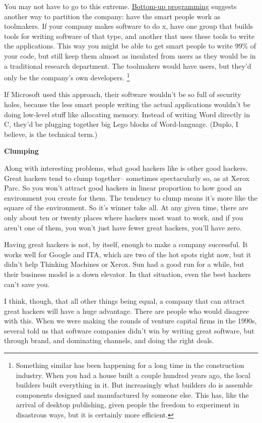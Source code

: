 You may not have to go to this extreme. \href{progbot.html}{Bottom-up
programming} suggests another way to partition the company: have the
smart people work as toolmakers. If your company makes software to do x,
have one group that builds tools for writing software of that type, and
another that uses these tools to write the applications. This way you
might be able to get smart people to write 99\% of your code, but still
keep them almost as insulated from users as they would be in a
traditional research department. The toolmakers would have users, but
they'd only be the company's own developers. \footnote{Something similar has been happening for a long time in the
construction industry. When you had a house built a couple hundred years
ago, the local builders built everything in it. But increasingly what
builders do is assemble components designed and manufactured by someone
else. This has, like the arrival of desktop publishing, given people the
freedom to experiment in disastrous ways, but it is certainly more
efficient.}

If Microsoft used this approach, their software wouldn't be so full of
security holes, because the less smart people writing the actual
applications wouldn't be doing low-level stuff like allocating memory.
Instead of writing Word directly in C, they'd be plugging together big
Lego blocks of Word-language. (Duplo, I believe, is the technical term.)

\textbf{Clumping}

Along with interesting problems, what good hackers like is other good
hackers. Great hackers tend to clump together-- sometimes spectacularly
so, as at Xerox Parc. So you won't attract good hackers in linear
proportion to how good an environment you create for them. The tendency
to clump means it's more like the square of the environment. So it's
winner take all. At any given time, there are only about ten or twenty
places where hackers most want to work, and if you aren't one of them,
you won't just have fewer great hackers, you'll have zero.

Having great hackers is not, by itself, enough to make a company
successful. It works well for Google and ITA, which are two of the hot
spots right now, but it didn't help Thinking Machines or Xerox. Sun had
a good run for a while, but their business model is a down elevator. In
that situation, even the best hackers can't save you.

I think, though, that all other things being equal, a company that can
attract great hackers will have a huge advantage. There are people who
would disagree with this. When we were making the rounds of venture
capital firms in the 1990s, several told us that software companies
didn't win by writing great software, but through brand, and dominating
channels, and doing the right deals.

